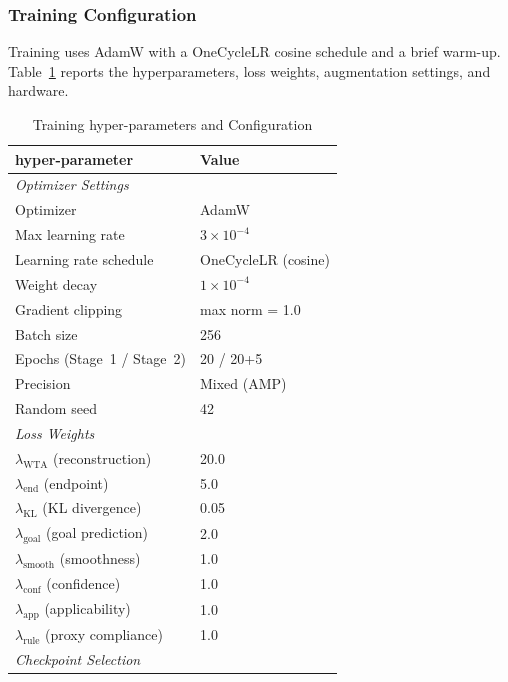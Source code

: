 \subsubsection{Training Configuration}

Training uses AdamW with a OneCycleLR cosine schedule and a brief warm-up. Table~\ref{tab:training_config} reports the hyperparameters, loss weights, augmentation settings, and hardware.

\begin{table}[t]
\centering
\caption{Training hyper-parameters and Configuration}
\label{tab:training_config}
\begin{tabular}{ll}
\toprule
\textbf{hyper-parameter} & \textbf{Value} \\
\midrule
\multicolumn{2}{l}{\textit{Optimizer Settings}} \\
Optimizer & AdamW \\
Max learning rate & $3 \times 10^{-4}$ \\
Learning rate schedule & OneCycleLR (cosine) \\
Weight decay & $1 \times 10^{-4}$ \\
Gradient clipping & max norm = 1.0 \\
Batch size & 256 \\
Epochs (Stage~1 / Stage~2) & 20 / 20+5 \\
Precision & Mixed (AMP) \\
Random seed & 42 \\
\midrule
\multicolumn{2}{l}{\textit{Loss Weights}} \\
$\lambda_{\text{WTA}}$ (reconstruction) & 20.0 \\
$\lambda_{\text{end}}$ (endpoint) & 5.0 \\
$\lambda_{\text{KL}}$ (KL divergence) & 0.05 \\
$\lambda_{\text{goal}}$ (goal prediction) & 2.0 \\
$\lambda_{\text{smooth}}$ (smoothness) & 1.0 \\
$\lambda_{\text{conf}}$ (confidence) & 1.0 \\
$\lambda_{\text{app}}$ (applicability) & 1.0 \\
$\lambda_{\text{rule}}$ (proxy compliance) & 1.0 \\
\midrule
\multicolumn{2}{l}{\textit{Checkpoint Selection}} \\


\end{tabular}
\end{table}
